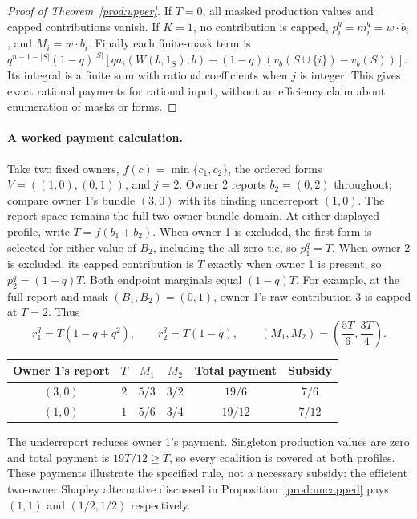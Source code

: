 \documentclass[11pt]{article}
\theoremstyle{definition}\newtheorem{definition}[theorem]{Definition}
\theoremstyle{remark}\newtheorem{remark}[theorem]{Remark}
\begin{document}
\begin{proof}[Proof of Theorem~\ref{prod:upper}]
If $T=0$, all masked production values and capped contributions vanish.
If $K=1$, no contribution is capped, $p_i^q=m_i^q=w\cdot b_i$, and
$M_i=w\cdot b_i$. Finally each finite-mask term is
$q^{n-1-|S|}(1-q)^{|S|}[q a_i(W(b,1_S),b)+(1-q)(v_b(S\cup\{i\})-v_b(S))]$.
Its integral is a finite sum with rational coefficients when $j$ is integer.
This gives exact rational payments for rational input, without an efficiency
claim about enumeration of masks or forms.
\end{proof}

\paragraph{A worked payment calculation.}
Take two fixed owners, $f(c)=\min\{c_1,c_2\}$, the ordered forms
$V=((1,0),(0,1))$, and $j=2$. Owner 2 reports $b_2=(0,2)$ throughout;
compare owner 1's bundle $(3,0)$ with its binding underreport $(1,0)$.
The report space remains the full two-owner bundle domain. At either displayed
profile, write $T=f(b_1+b_2)$. When owner 1 is excluded, the first form is
selected for either value of $B_2$, including the all-zero tie, so $p_1^q=T$.
When owner 2 is excluded, its capped contribution is $T$ exactly when owner 1
is present, so $p_2^q=(1-q)T$. Both endpoint marginals equal $(1-q)T$.
For example, at the full report and mask $(B_1,B_2)=(0,1)$, owner 1's
raw contribution $3$ is capped at $T=2$. Thus
\[
 r_1^q=T(1-q+q^2),\qquad r_2^q=T(1-q),\qquad
 (M_1,M_2)=\left(\frac{5T}{6},\frac{3T}{4}\right).
\]
\begin{center}
\begin{tabular}{cccccc}
\toprule
Owner 1's report & $T$ & $M_1$ & $M_2$ & Total payment & Subsidy\\
\midrule
$(3,0)$ & $2$ & $5/3$ & $3/2$ & $19/6$ & $7/6$\\
$(1,0)$ & $1$ & $5/6$ & $3/4$ & $19/12$ & $7/12$\\
\bottomrule
\end{tabular}
\end{center}
The underreport reduces owner 1's payment. Singleton production values are
zero and total payment is $19T/12\ge T$, so every coalition is covered at
both profiles. These payments illustrate the specified rule, not a necessary
subsidy: the efficient two-owner Shapley alternative discussed in
Proposition~\ref{prod:uncapped} pays $(1,1)$ and $(1/2,1/2)$ respectively.
\end{document}

